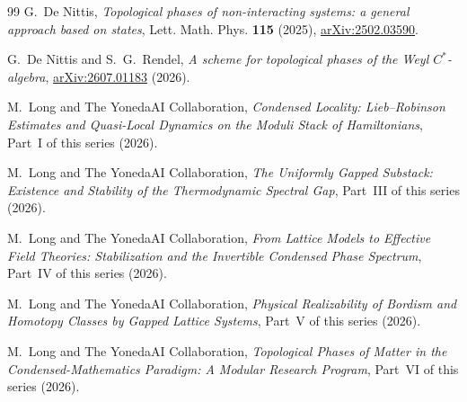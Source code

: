 \documentclass[12pt]{article}
\theoremstyle{plain}
\begin{document}
\begin{thebibliography}{99}
G.~De Nittis,
\emph{Topological phases of non-interacting systems: a general approach based on
states},
Lett. Math. Phys. \textbf{115} (2025), \href{https://arxiv.org/abs/2502.03590}{arXiv:2502.03590}.

G.~De Nittis and S.~G.~Rendel,
\emph{A scheme for topological phases of the Weyl $C^{*}$-algebra},
\href{https://arxiv.org/abs/2607.01183}{arXiv:2607.01183} (2026).

M.~Long and The YonedaAI Collaboration,
\emph{Condensed Locality: Lieb--Robinson Estimates and Quasi-Local Dynamics on the
Moduli Stack of Hamiltonians},
Part~I of this series (2026).

M.~Long and The YonedaAI Collaboration,
\emph{The Uniformly Gapped Substack: Existence and Stability of the Thermodynamic
Spectral Gap},
Part~III of this series (2026).

M.~Long and The YonedaAI Collaboration,
\emph{From Lattice Models to Effective Field Theories: Stabilization and the
Invertible Condensed Phase Spectrum},
Part~IV of this series (2026).

M.~Long and The YonedaAI Collaboration,
\emph{Physical Realizability of Bordism and Homotopy Classes by Gapped Lattice
Systems},
Part~V of this series (2026).

M.~Long and The YonedaAI Collaboration,
\emph{Topological Phases of Matter in the Condensed-Mathematics Paradigm: A Modular
Research Program},
Part~VI of this series (2026).

\end{thebibliography}
\end{document}
